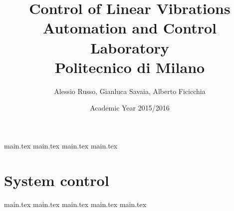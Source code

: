 \documentclass[10pt,a4paper]{report}
\author{Alessio Russo, Gianluca Savaia, Alberto Ficicchia}
\title{Control of Linear Vibrations \\
\Large Automation and Control Laboratory \\
 Politecnico di Milano}
\date{Academic Year 2015/2016}
\begin{document}
\maketitle
\tableofcontents

\clearpage
{main.tex}
\newpage
{main.tex}
\newpage
{main.tex}
\newpage
{main.tex}
\newpage
\part{System control}
	{main.tex}
\newpage
{main.tex}
\newpage
{main.tex}
\newpage
{main.tex}
\newpage
{main.tex}

\printbibliography
\end{document}
